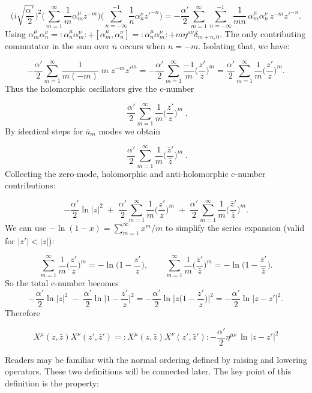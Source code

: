 \begin{tcolorbox}[breakable]
	$$
	\Big(i\sqrt{\frac{\alpha'}{2}}\Big)^2
	\Big(\sum_{m=1}^{\infty}\frac{1}{m}\alpha^{\mu}_m z^{-m}\Big)
	\Big(\sum_{n=-\infty}^{-1}\frac{1}{n}\alpha^{\nu}_n z'^{-n}\Big)
	= -\frac{\alpha'}{2}\sum_{m=1}^\infty\sum_{n=-\infty}^{-1}\frac{1}{mn}\,\alpha^{\mu}_m \alpha^{\nu}_n\,z^{-m}z'^{-n}.
	$$
	Using $\alpha^{\mu}_m \alpha^{\nu}_n = :\!\alpha^{\mu}_n \alpha^{\nu}_m\!:+[\alpha^{\mu}_m,\alpha^{\nu}_n]=:\!\alpha^{\mu}_n \alpha^{\nu}_m\!:+m\eta^{\mu \nu}\delta_{m+n,0}$. The only contributing commutator in the sum over $n$ occurs when $n=-m$. Isolating that, we have:
	
	$$
	-\frac{\alpha'}{2}\sum_{m=1}^\infty\frac{1}{m(-m)}\;m\;z^{-m}z'^{m}
	= -\frac{\alpha'}{2}\sum_{m=1}^\infty\frac{-1}{m}\Big(\frac{z'}{z}\Big)^m
	= \frac{\alpha'}{2}\sum_{m=1}^\infty\frac{1}{m}\Big(\frac{z'}{z}\Big)^m.
	$$
	Thus the holomorphic oscillators give the c-number
	
	$$
	\boxed{\;\frac{\alpha'}{2}\sum_{m=1}^\infty\frac{1}{m}\Big(\frac{z'}{z}\Big)^m\;}.
	$$
	By identical steps for $\overline a_m$ modes we obtain
	
	$$
	\boxed{\;\frac{\alpha'}{2}\sum_{m=1}^\infty\frac{1}{m}\Big(\frac{\bar z'}{\bar z}\Big)^m\; }.
	$$
	Collecting the zero-mode, holomorphic and anti-holomorphic c-number contributions:
	
	$$
	-\frac{\alpha'}{2}\ln|z|^2
	\;+\;\frac{\alpha'}{2}\sum_{m=1}^\infty\frac{1}{m}\Big(\frac{z'}{z}\Big)^m
	\;+\;\frac{\alpha'}{2}\sum_{m=1}^\infty\frac{1}{m}\Big(\frac{\bar z'}{\bar z}\Big)^m.
	$$
	We can use $-\ln(1-x)=\sum_{m=1}^\infty x^m/m$ to simplify the series expansion (valid for $|z'|<|z|$):
	
	$$
	\sum_{m=1}^\infty\frac{1}{m}\Big(\frac{z'}{z}\Big)^m = -\ln\Big(1-\frac{z'}{z}\Big),
	\qquad
	\sum_{m=1}^\infty\frac{1}{m}\Big(\frac{\bar z'}{\bar z}\Big)^m = -\ln\Big(1-\frac{\bar z'}{\bar z}\Big).
	$$
	So the total c-number becomes
	$$
	-\frac{\alpha'}{2}\ln|z|^2 \;-\;\frac{\alpha'}{2}\ln\Big|1-\frac{z'}{z}\Big|^2
	= -\frac{\alpha'}{2}\ln\Big| z\Big(1-\frac{z'}{z}\Big)\Big|^2
	= -\frac{\alpha'}{2}\ln|z-z'|^2.
	$$
	Therefore
	
	$$\boxed{X^{\mu}(z,\bar z)X^{\nu}(z',\bar z')
		= :X^{\mu}(z,\bar z)X^{\nu}(z',\bar z'):
		- \frac{\alpha'}{2}\eta^{\mu \nu}\,\ln|z-z'|^2}$$
		
\end{tcolorbox}
Readers may be familiar with the normal ordering defined by raising and lowering operators.    
These two definitions will be connected later.    
The key point of this definition is the property:    
